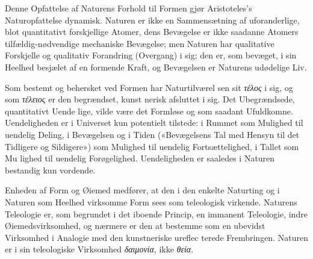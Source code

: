 \documentclass[12pt,a4paper]{book}
\newcommand{\gk}[1]{\textit{#1}}
\begin{document}
Denne Opfattelse af Naturens Forhold til Formen gjør
Aristoteles's Naturopfattelse dynamisk. Naturen er ikke en
Sammensætning af uforanderlige, blot quantitativt forskjellige
Atomer, dens Bevægelse er ikke saadanne Atomers tilfældig-nødvendige
mechaniske Bevægelse; men Naturen har qualitative
Forskjelle og qualitativ Forandring (Overgang) i sig; den er,
som bevæget, i sin Heelhed besjælet af en formende Kraft, og
Bevægelsen er Naturens udødelige Liv.

Som bestemt og behersket ved Formen har Naturtilværel\-%
sen sit \gk{τέλος} i sig, og som \gk{τέλειος} er den begrændset, kunst\-%
nerisk afsluttet i sig. Det Ubegrændsede, quantitativt Uende\-%
lige, vilde være det Formløse og som saadant Ufuldkomne.
Uendeligheden er i Universet kun potentielt tilstede: i Rummet
som Mulighed til uendelig Deling, i Bevægelsen og i Tiden
(«Bevægelsens Tal med Hensyn til det Tidligere og Sildigere»)
som Mulighed til uendelig Fortsættelighed, i Tallet som Mu\-%
lighed til uendelig Forøgelighed. Uendeligheden er saaledes i
Naturen bestandig kun vordende.

Enheden af Form og Øiemed medfører, at den i den
enkelte Naturting og i Naturen som Heelhed virksomme Form
sees som teleologisk virkende. Naturens Teleologie er, som
begrundet i det iboende Princip, en immanent Teleologie, indre
Øiemedsvirksomhed, og nærmere er den at bestemme som en
ubevidst Virksomhed i Analogie med den kunstneriske ureflec\-%
terede Frembringen. Naturen er i sin teleologiske Virksomhed
\gk{δαιμονία}, ikke \gk{θεία}.
\end{document}
